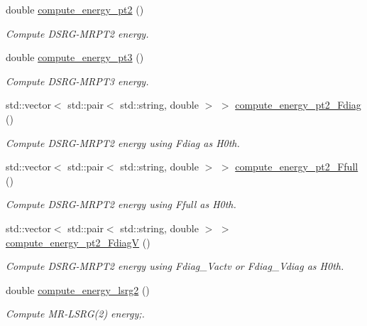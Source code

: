 \begin{DoxyCompactItemize}
double \mbox{\hyperlink{classforte_1_1_m_r_d_s_r_g_aa714d4ae7983e22ca4cbe172cb986849}{compute\+\_\+energy\+\_\+pt2}} ()
\begin{DoxyCompactList}\small\item\em Compute D\+S\+R\+G-\/\+M\+R\+P\+T2 energy. \end{DoxyCompactList}\item 
double \mbox{\hyperlink{classforte_1_1_m_r_d_s_r_g_a58529c00a2f52fedfa0e7c1d518f4dd2}{compute\+\_\+energy\+\_\+pt3}} ()
\begin{DoxyCompactList}\small\item\em Compute D\+S\+R\+G-\/\+M\+R\+P\+T3 energy. \end{DoxyCompactList}\item 
std\+::vector$<$ std\+::pair$<$ std\+::string, double $>$ $>$ \mbox{\hyperlink{classforte_1_1_m_r_d_s_r_g_a0ee1cab0fd69b2e37febcfc2c6bb13e2}{compute\+\_\+energy\+\_\+pt2\+\_\+\+Fdiag}} ()
\begin{DoxyCompactList}\small\item\em Compute D\+S\+R\+G-\/\+M\+R\+P\+T2 energy using Fdiag as H0th. \end{DoxyCompactList}\item 
std\+::vector$<$ std\+::pair$<$ std\+::string, double $>$ $>$ \mbox{\hyperlink{classforte_1_1_m_r_d_s_r_g_a92ee4ead63ced36b4414cf044da5a511}{compute\+\_\+energy\+\_\+pt2\+\_\+\+Ffull}} ()
\begin{DoxyCompactList}\small\item\em Compute D\+S\+R\+G-\/\+M\+R\+P\+T2 energy using Ffull as H0th. \end{DoxyCompactList}\item 
std\+::vector$<$ std\+::pair$<$ std\+::string, double $>$ $>$ \mbox{\hyperlink{classforte_1_1_m_r_d_s_r_g_afdf2b6a456d29ced7c498e48743c213e}{compute\+\_\+energy\+\_\+pt2\+\_\+\+FdiagV}} ()
\begin{DoxyCompactList}\small\item\em Compute D\+S\+R\+G-\/\+M\+R\+P\+T2 energy using Fdiag\+\_\+\+Vactv or Fdiag\+\_\+\+Vdiag as H0th. \end{DoxyCompactList}\item 
double \mbox{\hyperlink{classforte_1_1_m_r_d_s_r_g_aa6ecb7dedfe3e94202323f346f6a3520}{compute\+\_\+energy\+\_\+lsrg2}} ()
\begin{DoxyCompactList}\small\item\em Compute M\+R-\/\+L\+S\+RG(2) energy;. \end{DoxyCompactList}\item 

\end{DoxyCompactItemize}
